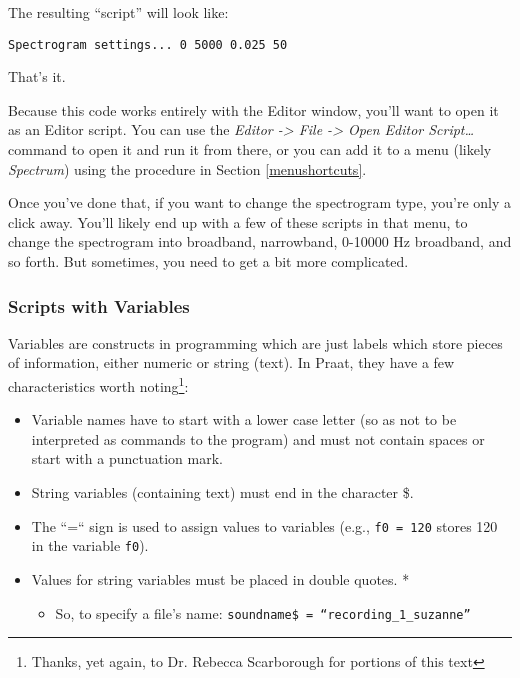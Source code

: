 \documentclass[11pt]{article}
\def\tightlist{}
\begin{document}
The resulting ``script'' will look like:

\begin{verbatim} 
Spectrogram settings... 0 5000 0.025 50
\end{verbatim}

That's it.

Because this code works entirely with the Editor window, you'll want to
open it as an Editor script. You can use the \emph{Editor
-\textgreater{} File -\textgreater{} Open Editor Script\ldots{}} command
to open it and run it from there, or you can add it to a menu (likely
\emph{Spectrum}) using the procedure in Section \ref{menushortcuts}.

Once you've done that, if you want to change the spectrogram type,
you're only a click away. You'll likely end up with a few of these
scripts in that menu, to change the spectrogram into broadband,
narrowband, 0-10000 Hz broadband, and so forth. But sometimes, you need
to get a bit more complicated.

\hypertarget{scripts-with-variables}{%
\subsubsection{Scripts with Variables}\label{scripts-with-variables}}

Variables are constructs in programming which are just labels which
store pieces of information, either numeric or string (text). In Praat,
they have a few characteristics worth
noting\footnote{Thanks, yet again, to Dr. Rebecca Scarborough for portions of this text}:

\begin{itemize}
\tightlist
\item
  Variable names have to start with a lower case letter (so as not to be
  interpreted as commands to the program) and must not contain spaces or
  start with a punctuation mark.
\item
  String variables (containing text) must end in the character \$.
\item
  The ``=`` sign is used to assign values to variables (e.g.,
  \texttt{f0 = 120} stores 120 in the variable \texttt{f0}).
\item
  Values for string variables must be placed in double quotes. *

  \begin{itemize}
  \tightlist
  \item
    So, to specify a file's name:
    \texttt{soundname\$ = “recording\_1\_suzanne”}
  \end{itemize}
\end{itemize}
\end{document}
